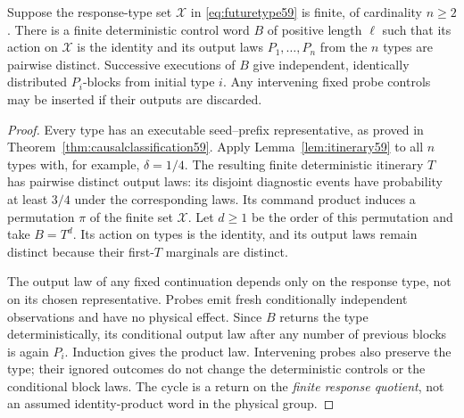 \begin{lemma}\label{lem:diagnosticcycle62}
Suppose the response-type set $\mathcal X$ in
\eqref{eq:futuretype59} is finite, of cardinality $n\ge2$.
There is a finite deterministic control word $B$ of positive length
$\ell$ such that its action on $\mathcal X$ is the identity and its
output laws $P_1,\ldots,P_n$ from the $n$ types are pairwise distinct.
Successive executions of $B$ give independent, identically distributed
$P_i$-blocks from initial type $i$. Any intervening fixed probe controls
may be inserted if their outputs are discarded.
\end{lemma}
\begin{proof}
Every type has an executable seed--prefix representative, as proved in
Theorem~\ref{thm:causalclassification59}. Apply
Lemma~\ref{lem:itinerary59} to all $n$ types with, for example,
$\delta=1/4$. The resulting finite deterministic itinerary $T$ has
pairwise distinct output laws: its disjoint diagnostic events have
probability at least $3/4$ under the corresponding laws. Its command
product induces a permutation $\pi$ of the finite set $\mathcal X$.
Let $d\ge1$ be the order of this permutation and take $B=T^d$.
Its action on types is the identity, and its output laws remain
distinct because their first-$T$ marginals are distinct.

The output law of any fixed continuation depends only on the response
type, not on its chosen representative. Probes emit fresh conditionally
independent observations and have no physical effect. Since $B$ returns
the type deterministically, its conditional output law after any number
of previous blocks is again $P_i$. Induction gives the product law.
Intervening probes also preserve the type; their ignored outcomes do not
change the deterministic controls or the conditional block laws. The
cycle is a return on the \emph{finite response quotient}, not an assumed
identity-product word in the physical group.
\end{proof}

